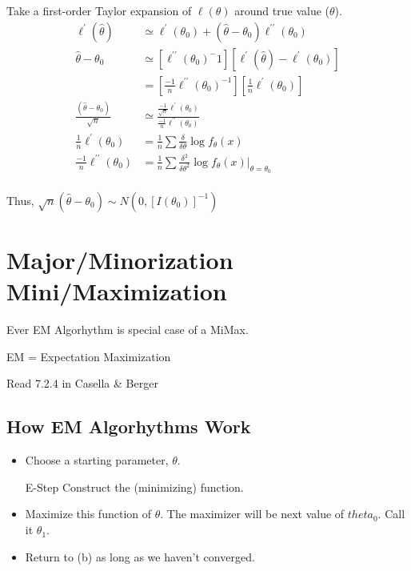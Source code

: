 \documentclass[11pt,fleqn]{book} %
\begin{document}
Take a first-order Taylor expansion of $\ell(\theta)$ around true value ($\theta$). 
\begin{align*}
\ell^\prime(\hat{\theta})&\simeq \ell^\prime(\theta_0) + (\hat{\theta}-\theta_0)\ell^{\prime\prime}(\theta_0)\\
\hat{\theta}-\theta_0&\simeq [\ell^{\prime\prime}(\theta_0)^-1][\ell^\prime(\hat{\theta})-\ell^\prime(\theta_0)]\\
	&=[\frac{-1}{n}\ell^{\prime\prime}(\theta_0)^{-1}][\frac{1}{n}\ell^\prime(\theta_0)]\\
\frac{(\hat{\theta}-\theta_0)}{\sqrt{n}}&\simeq \frac{\frac{-1}{\sqrt{n}}\ell^\prime(\theta_0)}{\frac{-1}{n}\ell^{\prime\prime}(\theta_0)}\\
\frac{1}{n}\ell^\prime(\theta_0)&= \frac{1}{n}\sum \frac{\delta}{\delta\theta}\log f_\theta(x)\\
\frac{-1}{n}\ell^{\prime\prime}(\theta_0)&= \frac{1}{n}\sum \frac{\delta^2}{\delta\theta^2}\log f_\theta(x)|_{\theta=\theta_0}\\
\end{align*}

Thus, $\sqrt{n}(\hat{\theta}-\theta_0)\sim N(0,[I(\theta_0)]^{-1})$

\section{Major/Minorization Mini/Maximization}

Ever EM Algorhythm is special case of a MiMax.

EM = Expectation Maximization

\begin{remark}
	Read 7.2.4 in Casella \& Berger
\end{remark}

\subsection{How EM Algorhythms Work}
\begin{itemize}
	\item Choose a starting parameter, $\theta$. 
	\item [E-Step] Construct the (minimizing) function.
	\item Maximize this function of $\theta$. The maximizer will be next value of $theta_0$. Call it $\theta_1$. 
	\item Return to (b) as long as we haven't converged.   
\end{itemize}
\end{document}

